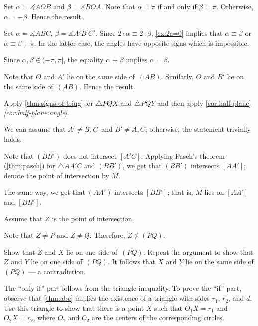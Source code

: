 \setcounter{eqtn}{0}

Set $\alpha=\measuredangle AOB$ 
and 
$\beta=\measuredangle BOA$.
Note that $\alpha=\pi$ if and only if $\beta=\pi$.
Otherwise, $\alpha=-\beta$.
Hence the result.

Set $\alpha=\measuredangle ABC$, $\beta=\measuredangle A'B'C'$.
Since $2\cdot\alpha\equiv 2\cdot \beta$, \ref{ex:2a=0} implies that
 $\alpha\equiv \beta$ or $\alpha\equiv \beta+\pi$.
In the latter case, the angles have opposite signs which is impossible.

Since $\alpha,\beta\in(-\pi,\pi]$, the equality $\alpha\equiv \beta$ implies $\alpha= \beta$.

Note that $O$ and $A'$
lie on the same side of~$(AB)$.
Similarly, $O$ and $B'$
lie on the same side of~$(AB)$.
Hence the result.

Apply \ref{thm:signs-of-triug} for $\triangle PQX$ and $\triangle PQY$ and then 
apply \ref{cor:half-plane}\textit{\ref{cor:half-plane:angle}}.

We can assume that $A'\ne B,C$ and $B'\ne A, C$;
otherwise, the statement trivially holds.

Note that $(BB')$ does not intersect $[A'C]$.
Applying Pasch's theorem (\ref{thm:pasch}) for $\triangle AA'C$ and $(BB')$, we get that 
$(BB')$ intersects $[AA']$; denote the point of intersection by $M$.

Тhe same way, we get that $(AA')$ intersects $[BB']$;
that is, $M$ lies on $[AA']$ and $[BB']$.

Assume that $Z$ is the point of intersection.

Note that $Z\ne P$ and $Z\ne Q$.
Therefore, $Z\notin (PQ)$.

Show that $Z$ and $X$ lie on one side of~$(PQ)$.
Repeat the argument to show that $Z$ and $Y$ lie on one side of~$(PQ)$.
It follows that $X$ and $Y$ lie on the same side of $(PQ)$ --- a contradiction.

 The ``only-if'' part follows from the triangle inequality.
To prove the ``if'' part,  
observe that \ref{thm:abc} implies the existence of a triangle with sides $r_1$, $r_2$, and $d$.
Use this triangle to show that there is a point $X$ such that $O_1X=r_1$ and $O_2X=r_2$, where $O_1$ and $O_2$ are the centers of the corresponding circles.

